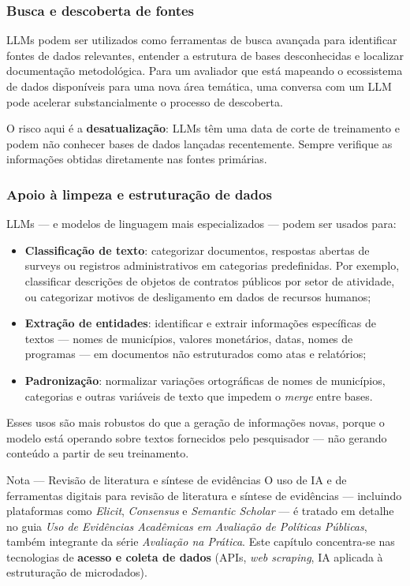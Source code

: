 \subsubsection{Busca e descoberta de fontes}

LLMs podem ser utilizados como ferramentas de busca avançada para identificar fontes de dados relevantes, entender a estrutura de bases desconhecidas e localizar documentação metodológica. Para um avaliador que está mapeando o ecossistema de dados disponíveis para uma nova área temática, uma conversa com um LLM pode acelerar substancialmente o processo de descoberta.

O risco aqui é a \textbf{desatualização}: LLMs têm uma data de corte de treinamento e podem não conhecer bases de dados lançadas recentemente. Sempre verifique as informações obtidas diretamente nas fontes primárias.

\subsubsection{Apoio à limpeza e estruturação de dados}

LLMs --- e modelos de linguagem mais especializados --- podem ser usados para:

\begin{itemize}
  \item \textbf{Classificação de texto}: categorizar documentos, respostas abertas de surveys ou registros administrativos em categorias predefinidas. Por exemplo, classificar descrições de objetos de contratos públicos por setor de atividade, ou categorizar motivos de desligamento em dados de recursos humanos;
  \item \textbf{Extração de entidades}: identificar e extrair informações específicas de textos --- nomes de municípios, valores monetários, datas, nomes de programas --- em documentos não estruturados como atas e relatórios;
  \item \textbf{Padronização}: normalizar variações ortográficas de nomes de municípios, categorias e outras variáveis de texto que impedem o \textit{merge} entre bases.
\end{itemize}

Esses usos são mais robustos do que a geração de informações novas, porque o modelo está operando sobre textos fornecidos pelo pesquisador --- não gerando conteúdo a partir de seu treinamento.

\begin{boxdica}{Nota --- Revisão de literatura e síntese de evidências}
O uso de IA e de ferramentas digitais para revisão de literatura e síntese de evidências --- incluindo plataformas como \textit{Elicit}, \textit{Consensus} e \textit{Semantic Scholar} --- é tratado em detalhe no guia \textit{Uso de Evidências Acadêmicas em Avaliação de Políticas Públicas}, também integrante da série \textit{Avaliação na Prática}. Este capítulo concentra-se nas tecnologias de \textbf{acesso e coleta de dados} (APIs, \textit{web scraping}, IA aplicada à estruturação de microdados).
\end{boxdica}

